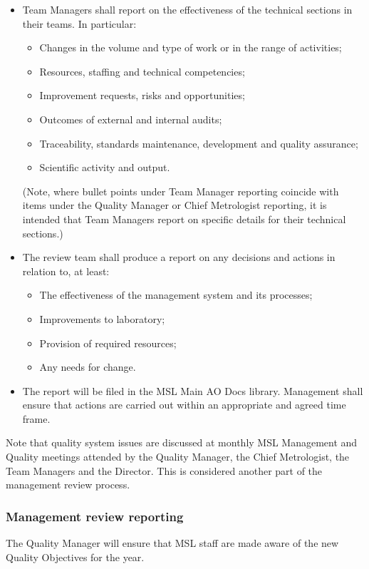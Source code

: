 \begin{itemize}
\item Team Managers shall report on the effectiveness of the technical sections in their teams. In particular: 
\begin{itemize}
\item Changes in the volume and type of work or in the range of activities;
\item Resources, staffing and technical competencies;
\item Improvement requests, risks and opportunities;
\item Outcomes of external and internal audits;
\item Traceability, standards maintenance, development and quality assurance;
\item Scientific activity and output.
\end{itemize}
(Note, where bullet points under Team Manager reporting coincide with items under the Quality Manager or Chief Metrologist reporting, it is intended that Team Managers report on specific details for their technical sections.) 
\item The review team shall produce a report on any decisions and actions in relation to, at least:
\begin{itemize}
\item The effectiveness of the management system and its processes;
\item Improvements to laboratory;
\item Provision of required resources;
\item Any needs for change.
\end{itemize}
\item The report will be filed in the MSL Main AO Docs library. Management shall ensure that actions are carried out within an appropriate and agreed time frame.
\end{itemize}

Note that quality system issues are discussed at monthly MSL Management and Quality meetings attended by the Quality Manager, the Chief Metrologist, the Team Managers and the Director. This is considered another part of the management review process.
\subsubsection{Management review reporting}
The Quality Manager will ensure that MSL staff are made aware of the new Quality Objectives for the year.